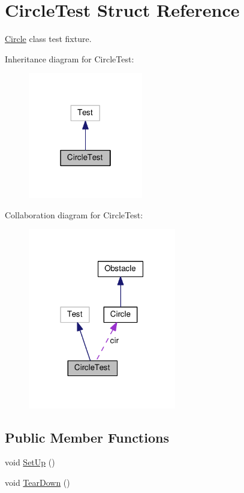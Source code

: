 \hypertarget{structCircleTest}{}\section{Circle\+Test Struct Reference}
\label{structCircleTest}


\hyperlink{classCircle}{Circle} class test fixture.  




Inheritance diagram for Circle\+Test\+:\nopagebreak
\begin{figure}[H]
\begin{center}
\leavevmode
\includegraphics[width=142pt]{structCircleTest__inherit__graph}
\end{center}
\end{figure}


Collaboration diagram for Circle\+Test\+:\nopagebreak
\begin{figure}[H]
\begin{center}
\leavevmode
\includegraphics[width=183pt]{structCircleTest__coll__graph}
\end{center}
\end{figure}
\subsection*{Public Member Functions}
\begin{DoxyCompactItemize}
\item 
void \hyperlink{structCircleTest_a57ef2225672262bbee9911bb0f249212}{Set\+Up} ()
\item 
void \hyperlink{structCircleTest_a77a5186daec84ff2c67d44d3464783e0}{Tear\+Down} ()
\end{DoxyCompactItemize}
